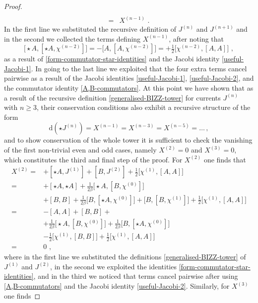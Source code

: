 \documentclass[12pt]{article}
\numberwithin{equation}{section}
\begin{document}
\begin{proof}
\begin{equation}
\begin{aligned}
\\
=&X^{(n-1)} \,\, .
\end{aligned}
\end{equation}
In the first line we substituted the recursive definition of $J^{(n)}$ and $J^{(n+1)}$ and in the second we collected the terms defining $X^{(n-1)}$, after noting that 
\begin{equation}
\bigl[\star A,[\star A,\chi^{(n-2)}] \bigr]=-\bigl[ A,[ A,\chi^{(n-2)}] \bigr] =+\tfrac{1}{2}\bigl[ \chi^{(n-2)},[A,A]\bigr] \,\, ,
\end{equation}
as a result of \eqref{form-commutator-star-identities} and the Jacobi identity \eqref{useful-Jacobi-1}. In going to the last line we exploited that the four extra terms cancel pairwise as a result of the Jacobi identities \eqref{useful-Jacobi-1}, \eqref{useful-Jacobi-2}, and the commutator identity \eqref{A,B-commutators}. At this point we have shown that as a result of the recursive definition \eqref{generalised-BIZZ-tower} for currents $J^{(n)}$ with $n\geq 3$, their conservation conditions also exhibit a recursive structure of the form
\begin{equation}
\mathrm{d}(\star J^{(n)})=X^{(n-1)}=X^{(n-3)}=X^{(n-5)} = \ldots \, ,
\end{equation}
and to show conservation of the whole tower it is sufficient to check the vanishing of the first non-trivial even and odd cases, namely $X^{(2)}=0$ and $X^{(3)}=0$, which constitutes the third and final step of the proof. For $X^{(2)}$ one finds that
%
\begin{equation}
\begin{aligned}
X^{(2)}=&+[\star A,J^{(1)}]+[ B,J^{(2)}]+\tfrac{1}{2}\bigl[\chi^{(1)},[A,A]\bigr]
\\
=&+[\star A,\star A]+\tfrac{1}{2\beta}\bigl[\star A,[B,\chi^{(0)}]\bigr]
\\
&+[B,B]+\tfrac{1}{2\beta}\bigl[B,[\star A,\chi^{(0)}]\bigr]+\bigl[B,[B,\chi^{(1)}]\bigr]+\tfrac{1}{2}\bigl[\chi^{(1)},[A,A]\bigr]
\\
=&-[A,A]+[B,B]+
\\
&+\tfrac{1}{2\beta}\bigl[\star A,[B,\chi^{(0)}]\bigr]+\tfrac{1}{2\beta}\bigl[B,[\star A,\chi^{(0)}]\bigr]
\\
&-\tfrac{1}{2}\bigl[\chi^{(1)},[B,B]\bigr]+\tfrac{1}{2}\bigl[\chi^{(1)},[A,A]\bigr]
\\
=&0 \,\, ,
\end{aligned}
\end{equation}
where in the first line we substituted the definitions \eqref{generalised-BIZZ-tower} of $J^{(1)}$ and $J^{(2)}$, in the second we exploited the identities \eqref{form-commutator-star-identities}, and in the third we noticed that terms cancel pairwise after using \eqref{A,B-commutators} and the Jacobi identity \eqref{useful-Jacobi-2}. Similarly, for $X^{(3)}$ one finds

\end{proof}
\end{document}
